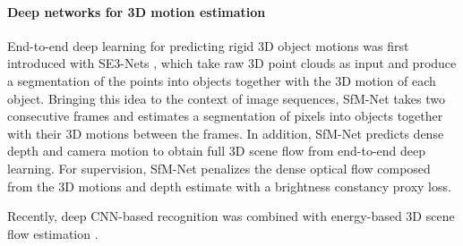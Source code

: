 \paragraph{Deep networks for 3D motion estimation}
End-to-end deep learning for predicting rigid 3D object motions was first introduced with
SE3-Nets \cite{SE3Nets}, which take raw 3D point clouds as input and produce a segmentation
of the points into objects together with the 3D motion of each object.
Bringing this idea to the context of image sequences, SfM-Net \cite{SfmNet} takes two consecutive frames and
estimates a segmentation of pixels into objects together with their 3D motions between the frames.
In addition, SfM-Net predicts dense depth and camera motion to obtain full 3D scene flow from end-to-end deep learning.
For supervision, SfM-Net penalizes the dense optical flow composed from the 3D motions and depth estimate
with a brightness constancy proxy loss.



Recently, deep CNN-based recognition was combined with energy-based 3D scene flow estimation \cite{Behl2017ICCV}.


\cite{FlowLayers}
\cite{ESI}
